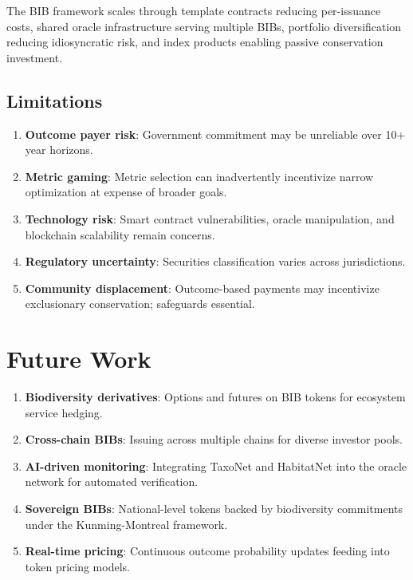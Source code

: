 \documentclass[11pt,a4paper]{article}
\begin{document}
The BIB framework scales through template contracts reducing
per-issuance costs, shared oracle infrastructure serving multiple BIBs,
portfolio diversification reducing idiosyncratic risk, and index products
enabling passive conservation investment.

\subsection{Limitations}

\begin{enumerate}
  \item \textbf{Outcome payer risk}: Government commitment may be
    unreliable over 10+ year horizons.
  \item \textbf{Metric gaming}: Metric selection can inadvertently
    incentivize narrow optimization at expense of broader goals.
  \item \textbf{Technology risk}: Smart contract vulnerabilities, oracle
    manipulation, and blockchain scalability remain concerns.
  \item \textbf{Regulatory uncertainty}: Securities classification
    varies across jurisdictions.
  \item \textbf{Community displacement}: Outcome-based payments may
    incentivize exclusionary conservation; safeguards essential.
\end{enumerate}


\section{Future Work}
\label{sec:future}

\begin{enumerate}
  \item \textbf{Biodiversity derivatives}: Options and futures on BIB
    tokens for ecosystem service hedging.
  \item \textbf{Cross-chain BIBs}: Issuing across multiple chains for
    diverse investor pools.
  \item \textbf{AI-driven monitoring}: Integrating TaxoNet and
    HabitatNet into the oracle network for automated verification.
  \item \textbf{Sovereign BIBs}: National-level tokens backed by
    biodiversity commitments under the Kunming-Montreal framework.
  \item \textbf{Real-time pricing}: Continuous outcome probability
    updates feeding into token pricing models.
\end{enumerate}
\end{document}
